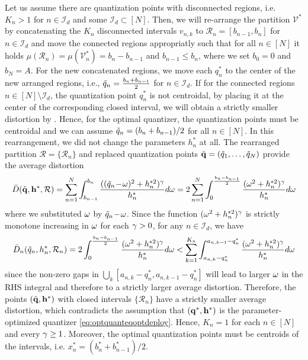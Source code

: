 \documentclass[12pt,onecolumn,journal,draftclsnofoot,letterpaper]{IEEEtran}
\newcommand{\Ind}{\mathcal{I}}
\renewcommand{\vp}{\mathbf q}
\newcommand{\Vor}{\ensuremath{\mathcal{V}}}         %
\newcommand{\Rset}{\ensuremath{\mathcal R}}
\newcommand{\Dis}{\ensuremath{D}}                    %
\newcommand{\AvDis}{\ensuremath{\bar{\Dis}}}         %
\begin{document}
  Let us assume there are quantization points with disconnected regions, i.e. $K_n>1$ for $n\in\Ind_d$ and some
  $\Ind_d\subset[N]$. Then, we will re-arrange the partition $\Vor^*$ by concatenating the $K_n$ disconnected
  intervals $v_{n,k}$ to $\Rset_n=[b_{n-1},b_{n}]$ for $n\in\Ind_d$ and move the connected regions appropriatly such that
  for all $n\in[N]$ it holds $\mu(\Rset_n)=\mu(\Vor^*_n)=b_n-b_{n-1}$ and $b_{n-1}\leq b_{n}$, where we set $b_0=0$ and
  $b_N=A$. For the new concatenated regions, we move each $q_n^*$ to the center of the new arranged regions, i.e.,
  $\tilde{q}_n=\frac{b_n+b_{n-1}}{2}$ for $n\in\Ind_d$. If for the connected regions $n\in[N]\setminus\Ind_d$, the
  quantization point $q^*_n$ is not centroidal, by placing it at the center of the corresponding closed interval,
  we will obtain a strictly smaller distortion by . Hence, for the optimal quantizer, the quantization
  points must be centroidal and we can assume $\tilde{q}_n=(b_n+b_{n-1})/2$ for all $n\in[N]$. 
  In this rearrangement, we did not change the parameters $h_n^*$ at all.  The rearranged partition
  $\Rset=\{\Rset_n\}$ and replaced quantization points $\tvp=(\tq_1,\dots,\tq_N)$ provide the average distortion 
  \begin{align}
    \AvDis(\tvp,\vh^*,\Rset)=\sum_{n=1}^N \int_{b_{n-1}}^{b_n} \frac{ ((\tq_n\!-\!\ome)^2+h_n^{*2})^{\gam}}{h_n^{*}} d\ome
      = 2\sum_{n=1}^N \int_{0}^{\frac{b_n-b_{n-1}}{2}} \frac{ (\ome^2+h_n^{*2})^{\gam}}{h_n^{*}} d\ome
  \end{align}
  where we substituted $\omega$ by $\tilde{q}_n\!-\!\omega$. Since the function
  $(\omega^2+h_n^{*2})^{\gamma}$ is strictly monotone increasing in $\omega$ for each $\gamma>0$, for any $n\in\Ind_d$, we have
  \begin{align}
   \AvDis_n(\tq_n,h_n^*,\Rset_n)=    2\int_{0}^{\frac{b_n-b_{n-1}}{2}} \frac{ (\ome^2+h_n^{*2})^{\gam}}{h_n^{*}} d\ome 
    < \sum_{k=1}^{K_n}\int_{a_{n,k}-q_n^*}^{a_{n,k-1}-q_n^*} \frac{ (\ome^2+h_n^{*2})^{\gam}}{h_n^{*}}
    d\ome\label{eq:Avdisn}
  \end{align}
  since the non-zero gaps in $\bigcup_k [a_{n,k}-q_n^*,a_{n,k-1}-q_n^*]$ will lead to larger $\omega$ in the RHS integral
  and therefore to a strictly larger average distortion.  Therefore, the points $(\tvp,\vh^*)$ with closed intervals
  $\{\Rset_n\}$ have a strictly smaller average distortion, which contradicts the assumption that $(\vp^*,\vh^*)$ is the
  parameter-optimized quantizer \eqref{eq:optquanteqoptdeploy}. Hence, $K_n=1$ for each $n\in[N]$ and every $\gamma\geq 1$.
  Moreover, the optimal quantization points must be centroids of the intervals, i.e. $x_n^*=(b_n^*+b^*_{n-1})/2$.
\end{document}
